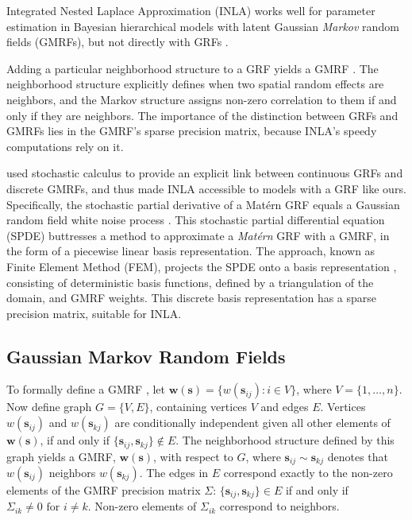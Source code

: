 Integrated Nested Laplace Approximation (INLA) works well for parameter estimation in Bayesian hierarchical models with latent Gaussian {\it Markov} random fields (GMRFs), but not directly with GRFs \citep{Rue2007}.

Adding a particular neighborhood structure to a GRF yields a GMRF \citep{Rue2007}. The neighborhood structure explicitly defines when two spatial random effects are neighbors, and the Markov structure assigns non-zero correlation to them if and only if they are neighbors. The importance of the distinction between GRFs and GMRFs lies in the GMRF's sparse precision matrix, because INLA's speedy computations rely on it.

\cite{Lindgren2011} used stochastic calculus \citep{Mao2007} to provide an explicit link between continuous GRFs and discrete GMRFs, and thus made INLA accessible to models with a GRF like ours. Specifically, the stochastic partial derivative of a Mat\'ern GRF equals a Gaussian random field white noise process \citep{Lindgren2011}. This stochastic partial differential equation (SPDE) buttresses a method to approximate a {\it Mat\'ern} GRF with a GMRF, in the form of a piecewise linear basis representation. The approach, known as Finite Element Method (FEM), projects the SPDE onto a basis representation \citep{Dhatt2012}, consisting of deterministic basis functions, defined by a triangulation of the domain, and GMRF weights. This discrete basis representation has a sparse precision matrix, suitable for INLA. 

\subsection{Gaussian Markov Random Fields}

To formally define a GMRF , let $\pmb{w}(\pmb{s}) = \{w(\pmb{s}_{ij}):i \in V\}$, where $V = \{1,\dots,n\}$. Now define graph $G = \{ V, E \}$, containing vertices $V$ and edges $E$. Vertices $w(\pmb{s}_{ij})$ and $w(\pmb{s}_{kj})$ are conditionally independent given all other elements of $\pmb{w}(\pmb{s})$, if and only if $\{\pmb{s}_{ij}, \pmb{s}_{kj}\} \notin E$. The neighborhood structure defined by this graph yields a GMRF, $\pmb{w}(\pmb{s})$, with respect to $G$, where $\pmb{s}_{ij} \sim \pmb{s}_{kj}$ denotes that $w(\pmb{s}_{ij})$ neighbors $w(\pmb{s}_{kj})$. The edges in $E$ correspond exactly to the non-zero elements of the GMRF precision matrix $\Sigma$: $\{\pmb{s}_{ij}, \pmb{s}_{kj}\} \in E$ if and only if $\Sigma_{ik} \neq 0 \text{ for } i \neq k$. Non-zero elements of $\Sigma_{ik}$ correspond to neighbors.

